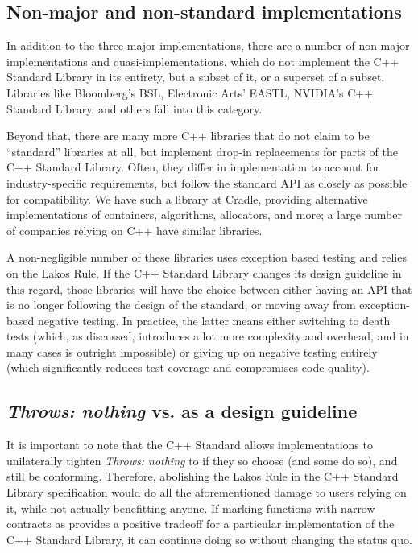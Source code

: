 \subsection{Non-major and non-standard implementations}

In addition to the three major implementations, there are a number of non-major implementations and quasi-implementations, which do not implement the C++ Standard Library in its entirety, but a subset of it, or a superset of a subset. Libraries like Bloomberg's BSL, Electronic Arts' EASTL, NVIDIA's C++ Standard Library, and others fall into this category.

Beyond that, there are many more C++ libraries that do not claim to be ``standard'' libraries at all, but implement drop-in replacements for parts of the C++ Standard Library. Often, they differ in implementation to account for industry-specific requirements, but follow the standard API as closely as possible for compatibility. We have such a library at Cradle, providing alternative implementations of containers, algorithms, allocators, and more; a large number of companies relying on C++ have similar libraries.

A non-negligible number of these libraries uses exception based testing and relies on the Lakos Rule. If the C++ Standard Library changes its design guideline in this regard, those libraries will have the choice between either having an API that is no longer following the design of the standard, or moving away from exception-based negative testing. In practice, the latter means either switching to death tests (which, as discussed, introduces a lot more complexity and overhead, and in many cases is outright impossible) or giving up on negative testing entirely (which significantly reduces test coverage and compromises code quality).

\subsection{\emph{Throws: nothing} vs.  as a design guideline}

It is important to note that the C++ Standard allows implementations to unilaterally tighten \emph{Throws: nothing} to  if they so choose (and some do so), and still be conforming. Therefore, abolishing the Lakos Rule in the C++ Standard Library specification would do all the aforementioned damage to users relying on it, while not actually benefitting anyone. If marking functions with narrow contracts as  provides a positive tradeoff for a particular implementation of the C++ Standard Library, it can continue doing so without changing the status quo.

